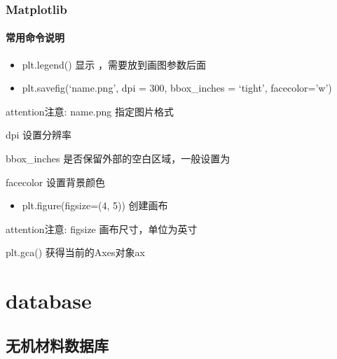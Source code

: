 \documentclass[a4paper,12pt,english]{sphinxmanual}
\begin{document}
\subsection{Matplotlib}
\label{\detokenize{note/python/matplotlib:matplotlib}}\label{\detokenize{note/python/matplotlib::doc}}

\subsubsection{常用命令说明}
\label{\detokenize{note/python/matplotlib:id1}}\begin{itemize}
\item {} 
\sphinxAtStartPar
plt.legend() 显示 ，需要放到画图参数后面

\item {} 
\sphinxAtStartPar
plt.savefig(‘name.png’, dpi = 300, bbox\_inches = ‘tight’, facecolor=’w’)

\end{itemize}

\begin{sphinxadmonition}{attention}{注意:}
\sphinxAtStartPar
name.png 指定图片格式

\sphinxAtStartPar
dpi 设置分辨率

\sphinxAtStartPar
bbox\_inches 是否保留外部的空白区域，一般设置为 

\sphinxAtStartPar
facecolor 设置背景颜色
\end{sphinxadmonition}
\begin{itemize}
\item {} 
\sphinxAtStartPar
plt.figure(figsize=(4, 5)) 创建画布

\end{itemize}

\begin{sphinxadmonition}{attention}{注意:}
\sphinxAtStartPar
figsize 画布尺寸，单位为英寸

\sphinxAtStartPar
plt.gca() 获得当前的Axes对象ax
\end{sphinxadmonition}


\chapter{database}
\label{\detokenize{database:database}}\label{\detokenize{database::doc}}

\section{无机材料数据库}
\label{\detokenize{database:id1}}
\end{document}
